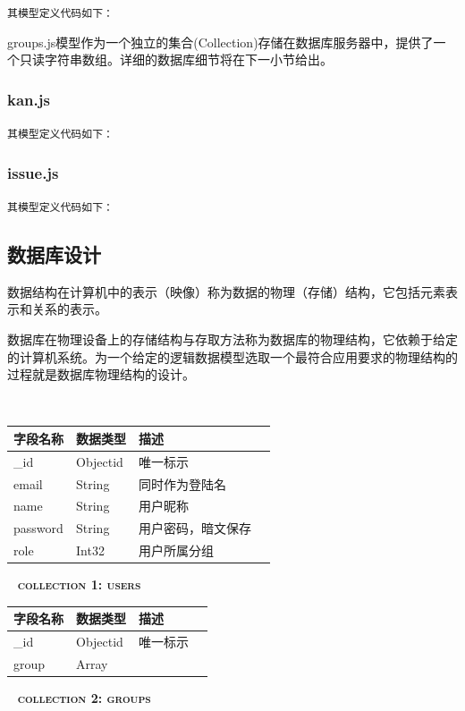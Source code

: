 \noindent
\texttt{\large 其模型定义代码如下：}


\noindent
groups.js模型作为一个独立的集合(Collection)存储在数据库服务器中，提供了一个只读字符串数组。详细的数据库细节将在下一小节给出。

\subsubsection{kan.js}

\noindent
\texttt{\large 其模型定义代码如下：}


\subsubsection{issue.js}

\noindent
\texttt{\large 其模型定义代码如下：}


\subsection{数据库设计}

\indent
数据结构在计算机中的表示（映像）称为数据的物理（存储）结构，它包括元素表示和关系的表示。

\indent
数据库在物理设备上的存储结构与存取方法称为数据库的物理结构，它依赖于给定的计算机系统。为一个给定的逻辑数据模型选取一个最符合应用要求的物理结构的过程就是数据库物理结构的设计。
\par~

\begin{center}
	\begin{tabular}{ | l | l | l | l | }
		\hline
  	{\bf 字段名称} & {\bf 数据类型} & {\bf 描述} \\
  	\hline
  	\_id & Objectid & 唯一标示 \\
  	\hline
  	email & String & 同时作为登陆名 \\
  	\hline
  	name & String & 用户昵称 \\
  	\hline
  	password & String & 用户密码，暗文保存 \\
  	\hline
  	role & Int32 & 用户所属分组 \\
  	\hline
	\end{tabular}
	\par~
		\textsc{\bf collection 1: users}
\end{center}

\begin{center}
	\begin{tabular}{ | l | l | l | l | }
		\hline
  	{\bf 字段名称} & {\bf 数据类型} & {\bf 描述} \\
  	\hline
  	\_id & Objectid & 唯一标示 \\
  	\hline
  	group & Array &  \\
  	\hline
	\end{tabular}
	\par~
		\textsc{\bf collection 2: groups}
\end{center}

